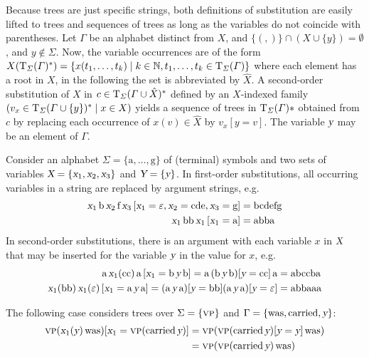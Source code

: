 \documentclass[../document.tex]{subfiles}
\begin{document}
    Because trees are just specific strings, both definitions of substitution are easily lifted to trees and sequences of trees as long as the variables do not coincide with parentheses.
    Let \(\varGamma\) be an alphabet distinct from \(X\), and \(\{ (, ) \} \cap (X \cup \{y\}) = \emptyset\), and \(y \notin \varSigma\).
    Now, the variable occurrences are of the form \(X(\operatorname{T}_\varSigma(\varGamma)^*) = \{x(t_1, \ldots, t_k) \mid k \in \mathbb{N}, t_1, \ldots, t_k \in \operatorname{T}_{\varSigma}(\varGamma)\}\) where each element has a root in \(X\), in the following the set is abbreviated by \(\hat{X}\).
    A second-order substitution of \(X\) in \(c \in \operatorname{T}_\varSigma(\varGamma \cup \hat{X})^*\) defined by an \(X\)-indexed family \((v_x \in \operatorname{T}_\varSigma(\varGamma \cup \{y\})^* \mid x \in X)\) yields a sequence of trees in \(\operatorname{T}_\varSigma(\varGamma)*\) obtained from \(c\) by replacing each occurrence of \(x(v) \in \hat{X}\) by \(v_x[y=v]\).
    The variable \(\textsl{y}\) may be an element of \(\varGamma\).

    \begin{example}[Substitution]
        Consider an alphabet \(\Sigma = \{\text{a}, \ldots, \text{g}\}\) of (terminal) symbols and two sets of variables \(\textsl{X} = \{\textsl{x}_1, \textsl{x}_2, \textsl{x}_3\}\) and \(\textsl{Y} = \{\textsl{y}\}\).
        In first-order substitutions, all occurring variables in a string are replaced by argument strings, e.g.
        \begin{align*}
            \textsl{x}_1 \, \text{b} \, \textsl{x}_2 \, \text{f} \, \textsl{x}_3\,[\textsl{x}_1=\varepsilon, \textsl{x}_2=\text{cde}, \textsl{x}_3=\text{g}] &= \text{bcdefg} \\
            \textsl{x}_1 \, \text{bb} \, \textsl{x}_1 \, [\textsl{x}_1=\text{a}] &= \text{abba}
        \end{align*}
        In second-order substitutions, there is an argument with each variable \(x\) in \(\textsl{X}\) that may be inserted for the variable \(\textsl{y}\) in the value for \(x\), e.g.
        \begin{align*}
            \text{a} \, \textsl{x}_1(\text{cc}) \, \text{a} \, [\textsl{x}_1=\text{b}\,\textsl{y}\,\text{b}] = \text{a} \, (\text{b}\,\textsl{y}\,\text{b})[\textsl{y}=\text{cc}] \, \text{a} &= \text{abccba} \\
            \textsl{x}_1(\text{bb}) \, \textsl{x}_1(\varepsilon) \, [\textsl{x}_1=\text{a}\,\textsl{y}\,\text{a}] = (\text{a}\,\textsl{y}\,\text{a})[\textsl{y}=\text{bb}] (\text{a}\,\textsl{y}\,\text{a})[\textsl{y}=\varepsilon] &= \text{abbaaa}
        \end{align*}

        The following case considers trees over \(\Sigma=\{\textsc{vp}\}\) and \(\Gamma=\{\text{was}, \text{carried}, \textsl{y}\}\):
        \begin{align*}
            \textsc{vp}( \textsl{x}_1(\textsl{y}) \, \text{was} )[\textsl{x}_1=\textsc{vp}(\text{carried}\,\textsl{y})]
                &= \textsc{vp}( \textsc{vp}(\text{carried}\,\textsl{y})[\textsl{y}=\textsl{y}] \, \text{was} ) \\
                &= \textsc{vp}(\textsc{vp}(\text{carried}\,\textsl{y})\,\text{was})
        \end{align*}
    \end{example}
\end{document}
